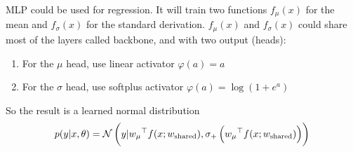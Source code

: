 MLP could be used for regression. It will train two functions $f_\mu (x)$ for the mean and $f_\sigma (x)$ for the standard derivation. $f_\mu(x)$ and $f_\sigma(x)$ could share most of the layers called backbone, and with two output (heads):
\begin{enumerate}
    \item For the $\mu$ head, use linear activator $\varphi(a) = a$
    \item For the $\sigma$ head, use softplus activator $\varphi(a) = \log(1 + e^a)$
\end{enumerate}

So the result is a learned normal distribution
\begin{equation}
    p(y|x,\theta) = \mathcal{N}\left(y| {w_\mu}^\top f(x;w_{\text{shared}}), \sigma_{+} \left( {w_\mu}^\top f(x;w_{\text{shared}}) \right)  \right)
\end{equation}














































































